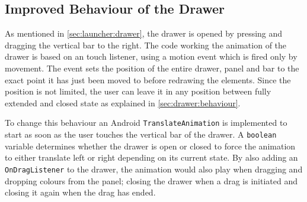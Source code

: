 \subsection{Improved Behaviour of the Drawer}
As mentioned in \cref{sec:launcher:drawer}, the drawer is opened by pressing and dragging the vertical bar to the right.
The code working the animation of the drawer is based on an touch listener, using a motion event which is fired only by movement.
The event sets the position of the entire drawer, panel and bar to the exact point it has just been moved to before redrawing the elements.
Since the position is not limited, the user can leave it in any position between fully extended and closed state as explained in \cref{sec:drawer:behaviour}.

To change this behaviour an Android \lstinline{TranslateAnimation} is implemented to start as soon as the user touches the vertical bar of the drawer.
A \lstinline{boolean} variable determines whether the drawer is open or closed to force the animation to either translate left or right depending on its current state.
By also adding an \lstinline{OnDragListener} to the drawer, the animation would also play when dragging and dropping colours from the panel; closing the drawer when a drag is initiated and closing it again when the drag has ended.